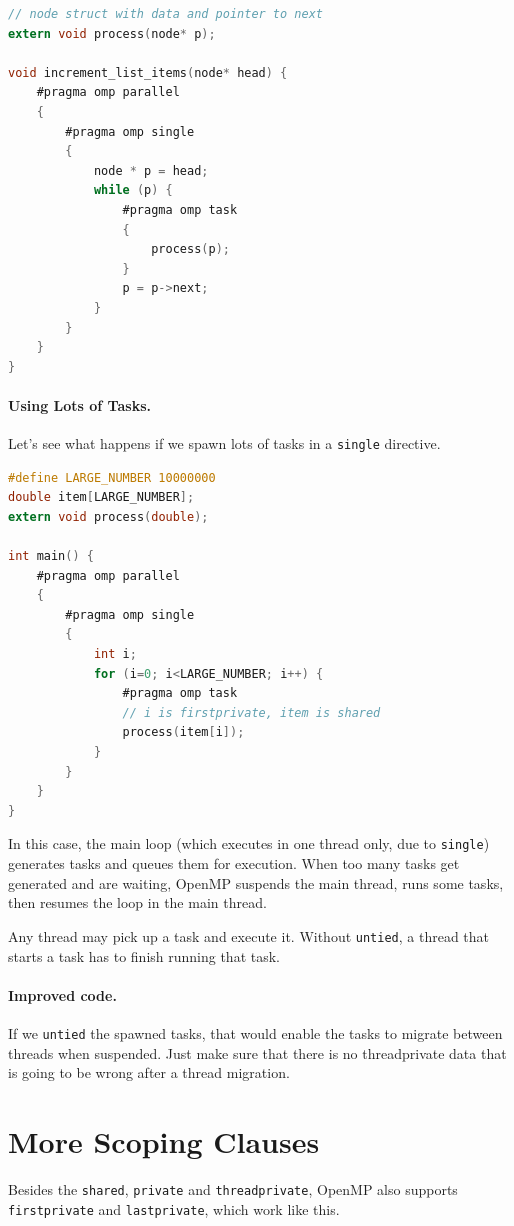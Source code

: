 \documentclass[a4paper]{report}
\begin{document}
  \begin{lstlisting}[language=C]
// node struct with data and pointer to next
extern void process(node* p);

void increment_list_items(node* head) {
    #pragma omp parallel
    {
        #pragma omp single
        {
            node * p = head;
            while (p) {
                #pragma omp task
                {
                    process(p);
                }
                p = p->next;
            }
        }
    }
}
  \end{lstlisting}

\paragraph{Using Lots of Tasks.} Let's see what happens
if we spawn lots of tasks in a {\tt single} directive.

  \begin{lstlisting}[language=C]
#define LARGE_NUMBER 10000000
double item[LARGE_NUMBER];
extern void process(double);

int main() {
    #pragma omp parallel
    {
        #pragma omp single
        {
            int i;
            for (i=0; i<LARGE_NUMBER; i++) {
                #pragma omp task
                // i is firstprivate, item is shared
                process(item[i]);
            }
        }
    }
}
  \end{lstlisting}

In this case, the main loop (which executes in one thread only, due to {\tt single}) generates tasks and queues them for execution. When too many tasks get generated and are waiting, OpenMP suspends the main thread, runs some tasks, then resumes the loop in the main thread.

Any thread may pick up a task and execute it. Without {\tt untied}, a thread that starts a task has to finish running that task.

\paragraph{Improved code.} If we {\tt untied} the spawned tasks, that would enable the tasks to
migrate between threads when suspended. Just make sure that there is no threadprivate data that
is going to be wrong after a thread migration.

\section*{More Scoping Clauses}
Besides the {\tt shared}, {\tt private} and {\tt threadprivate}, OpenMP also 
supports {\tt firstprivate} and {\tt lastprivate}, which work like this.
\end{document}
